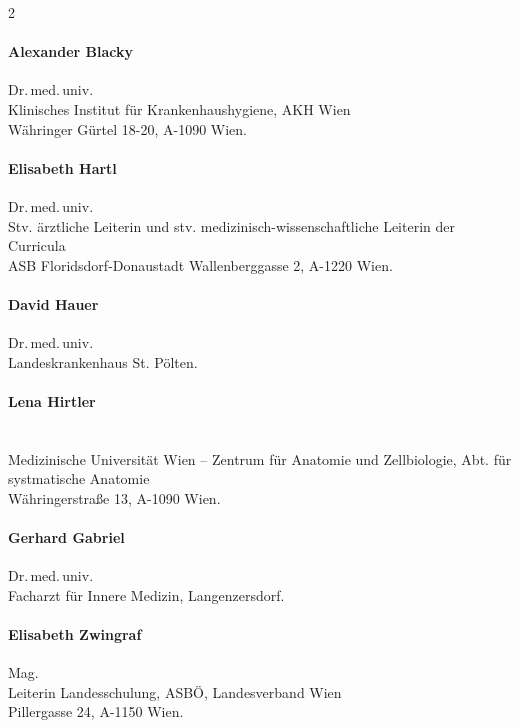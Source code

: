\documentclass[
ngerman,
paper=a4,
asymmetric,
fontsize=9pt,
headings=small,
draft=false,
parskip=false,
footnotes=multiple,
]{scrbook}
\begin{document}
\begin{multicols}{2} 

    \paragraph{Alexander Blacky}
    Dr.\,med.\,univ.\\
    Klinisches Institut für Krankenhaushygiene, AKH Wien\\    
    Währinger Gürtel 18-20, A-1090 Wien.
    
    \paragraph{Elisabeth Hartl}
    Dr.\,med.\,univ.\\    
    Stv. ärztliche Leiterin und stv. medizinisch-wissenschaftliche Leiterin der
    Curricula\\    
    ASB Floridsdorf-Donaustadt
    Wallenberggasse 2, A-1220 Wien.
    
    \paragraph{David Hauer}
    Dr.\,med.\,univ.\\    
    Landeskrankenhaus St. Pölten.
    
    \paragraph{Lena Hirtler}~\\
    Medizinische Universität Wien -- Zentrum für Anatomie und
    Zellbiologie, Abt. für systmatische Anatomie\\    
    Währingerstraße 13, A-1090 Wien.


    \paragraph{Gerhard Gabriel}
    Dr.\,med.\,univ. \\    
    Facharzt für Innere Medizin, Langenzersdorf.
    
    \paragraph{Elisabeth Zwingraf}
    Mag. \\    
    Leiterin Landesschulung, ASBÖ, Landesverband Wien\\    
    Pillergasse 24, A-1150 Wien.
    
    
\end{multicols}
\end{document}
